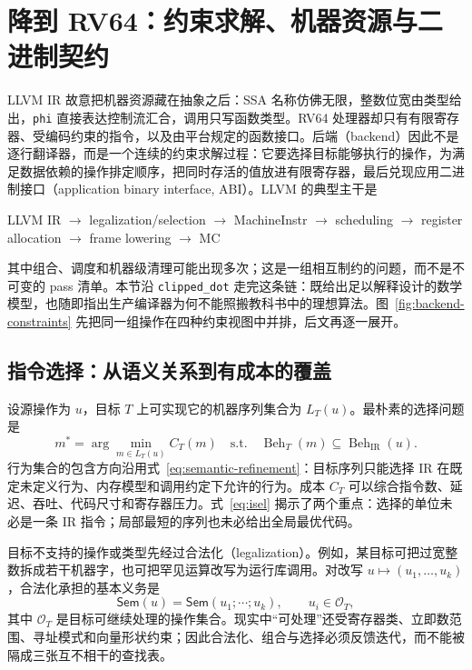 \section{降到 RV64：约束求解、机器资源与二进制契约}
\label{sec:backend}
\label{sec:riscv}

LLVM IR 故意把机器资源藏在抽象之后：SSA 名称仿佛无限，整数位宽由类型给出，\texttt{phi} 直接表达控制流汇合，调用只写函数类型。RV64 处理器却只有有限寄存器、受编码约束的指令，以及由平台规定的函数接口。后端（backend）因此不是逐行翻译器，而是一个连续的约束求解过程：它要选择目标能够执行的操作，为满足数据依赖的操作排定顺序，把同时存活的值放进有限寄存器，最后兑现应用二进制接口（application binary interface, ABI）。LLVM 的典型主干是

\begin{center}
\small\ttfamily
LLVM IR $\rightarrow$ legalization/selection $\rightarrow$ MachineInstr
$\rightarrow$ scheduling $\rightarrow$ register allocation
$\rightarrow$ frame lowering $\rightarrow$ MC
\end{center}

其中组合、调度和机器级清理可能出现多次；这是一组相互制约的问题，而不是不可变的 pass 清单\cite{llvm-codegen}。本节沿 \texttt{clipped\_dot} 走完这条链：既给出足以解释设计的数学模型，也随即指出生产编译器为何不能照搬教科书中的理想算法。图~\ref{fig:backend-constraints} 先把同一组操作在四种约束视图中并排，后文再逐一展开。



\subsection{指令选择：从语义关系到有成本的覆盖}

设源操作为 $u$，目标 $T$ 上可实现它的机器序列集合为 $L_T(u)$。最朴素的选择问题是
\begin{equation}
  m^*=\arg\min_{m\in L_T(u)} C_T(m)
  \quad\text{s.t.}\quad
  \operatorname{Beh}_T(m)\subseteq
  \operatorname{Beh}_{\mathrm{IR}}(u) .
  \label{eq:isel}
\end{equation}
行为集合的包含方向沿用式~\eqref{eq:semantic-refinement}：目标序列只能选择 IR 在既定未定义行为、内存模型和调用约定下允许的行为。成本 $C_T$ 可以综合指令数、延迟、吞吐、代码尺寸和寄存器压力。式~\ref{eq:isel} 揭示了两个重点：选择的单位未必是一条 IR 指令；局部最短的序列也未必给出全局最优代码。

目标不支持的操作或类型先经过合法化（legalization）。例如，某目标可把过宽整数拆成若干机器字，也可把罕见运算改写为运行库调用。对改写 $u\mapsto(u_1,\ldots,u_k)$，合法化承担的基本义务是
\[
  \mathsf{Sem}(u)=\mathsf{Sem}(u_1;\cdots;u_k),
  \qquad u_i\in\mathcal{O}_T,
\]
其中 $\mathcal{O}_T$ 是目标可继续处理的操作集合。现实中“可处理”还受寄存器类、立即数范围、寻址模式和向量形状约束；因此合法化、组合与选择必须反馈迭代，而不能被隔成三张互不相干的查找表。

